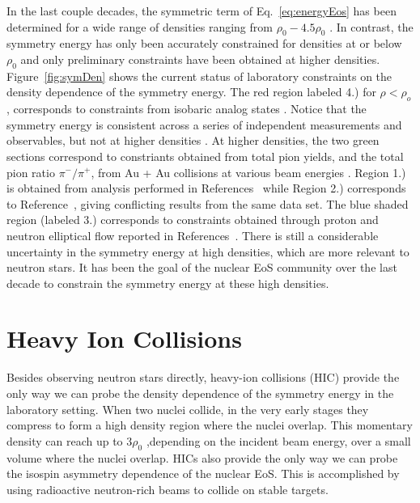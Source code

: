 In the last couple decades, the symmetric term of Eq.~\ref{eq:energyEos} has been determined for a wide range of densities ranging from $\rho_0 - 4.5\rho_0$ \cite{scienceEos}. In contrast, the symmetry energy has only been accurately constrained for densities at or below $\rho_0$ and only preliminary constraints have been obtained at higher densities. Figure~\ref{fig:symDen} shows the current status of laboratory constraints on the density dependence of the symmetry energy. The red region labeled 4.) for $\rho < \rho_o$, corresponds to constraints from isobaric analog states \cite{dan2014}. Notice that the symmetry energy is consistent across  a series of independent measurements and observables, but not at higher densities \cite{awayforward}. At higher densities, the two green sections correspond to constriants obtained from total pion yields, and the total pion ratio $\pi^-/\pi^+$, from Au + Au collisions at various beam energies \cite{fopi}. Region 1.) is obtained from analysis performed in References~\cite{xia2009,xie2013} while Region 2.) corresponds to Reference~\cite{feng2010}, giving conflicting results from the same data set. The blue shaded region (labeled 3.) corresponds to constraints obtained through proton and neutron elliptical flow reported in References~\cite{russo2016,cozma2016,cozma2017}. There is still a considerable uncertainty in the symmetry energy at high densities, which are more relevant to neutron stars. It has been the goal of the nuclear EoS community over the last decade to constrain the symmetry energy at these high densities. 




\section{Heavy Ion Collisions}
Besides observing neutron stars directly, heavy-ion collisions (HIC) provide the only way we can probe the density dependence of the symmetry energy in the laboratory setting. When two nuclei collide, in the very early stages they compress to form a high density region where the nuclei overlap. This momentary density can reach up to $3\rho_0$ ,depending on the incident beam energy, over a small volume where the nuclei overlap.  HICs also provide the only way we can probe the isospin asymmetry dependence of the nuclear EoS. This is accomplished by using radioactive neutron-rich beams to collide on stable targets. 


